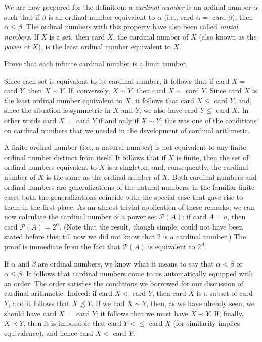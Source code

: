 We are now prepared for the definition: a \textit{cardinal number} is an ordinal number $\alpha$ such that if $\beta$ is an ordinal number equivalent to $\alpha$ (i.e., card $\alpha =$ card $\beta$), then $\alpha \le \beta$. The ordinal numbers with this property have also been called \textit{initial numbers}. If $X$ is a set, then card $X$, the cardinal number of $X$ (also known as the \textit{power} of $X$), is the least ordinal number equivalent to $X$. 

\begin{named}[EXERCISE. ] Prove that each infinite cardinal number is a limit number.
\end{named}

Since each set is equivalent to its cardinal number, it follows that if card $X =$ card $Y$, then $X \sim Y$. If, conversely, $X \sim Y$, then card $X \sim $ card $Y$. Since card $X$ is the least ordinal number equivalent to $X$, it follows that card $X \le $ card $Y$, and, since the situation is symmetric in $X$ and $Y$, we also have card $Y \le $ card $X$. In other words card $X =$ card $Y$ if and only if $X \sim Y$; this was one of the conditions on cardinal numbers that we needed in the development of cardinal arithmetic. 

A finite ordinal number (i.e., a natural number) is not equivalent to any finite ordinal number distinct from itself. It follows that if $X$ is finite, then the set of ordinal numbers equivalent to $X$ is a singleton, and, consequently, the cardinal number of $X$ is the same as the ordinal number of $X$. Both cardinal numbers and ordinal numbers are generalizations of the natural numbers; in the familiar finite cases both the generalizations coincide with the special case that gave rise to them in the first place. As an almost trivial application of these remarks, we can now calculate the cardinal number of a power set $\mathcal{P}(A)$: if card $A = a$, then card $\mathcal{P}(A) = 2^{\alpha}$. (Note that the result, though simple, could not have been stated before this; till now we did not know that $2$ is a cardinal number.) The proof is immediate from the fact that $\mathcal{P}(A)$ is equivalent to $2^{A}$. 

If $\alpha$ and $\beta$ are ordinal numbers, we know what it means to say that $\alpha < \beta$ or $\alpha \le \beta$. It follows that cardinal numbers come to us automatically equipped with an order. The order satisfies the conditions we borrowed for our discussion of cardinal  arithmetic. Indeed: if card $X <$ card $Y$, then card $X$ is a subset of card $Y$, and it follows that $X \precsim Y$. If we had $X \sim Y$, then, as we have already seen, we should have card $X =$ card $Y$; it follows that we must have $X \prec Y$. If, finally, $X \prec Y$, then it is impossible that card $Y <\le$ card $X$ (for similarity implies equivalence), and hence card $X <$ card $Y$. 

